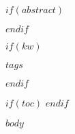 \documentclass[a4paper,11pt,oneside,oldfontcommands]{memoir}
\subtitle{$subtitle$}
\date{\today}
\theoremstyle{definition}
\theoremstyle{break}	%
\numberwithin{equation}{chapter}
\numberwithin{figure}{chapter}
\begin{document}


$if(abstract)$
\begin{abstract}
$abstract$
\end{abstract}
$endif$


$if(kw)$		%
\begin{keywords}
$tags$
\end{keywords}
$endif$


%
$if(toc)$		%
\tableofcontents
\pagebreak
\printglossaries
$endif$

\listoftodos

\pagebreak


$body$



\printindex

\end{document}
